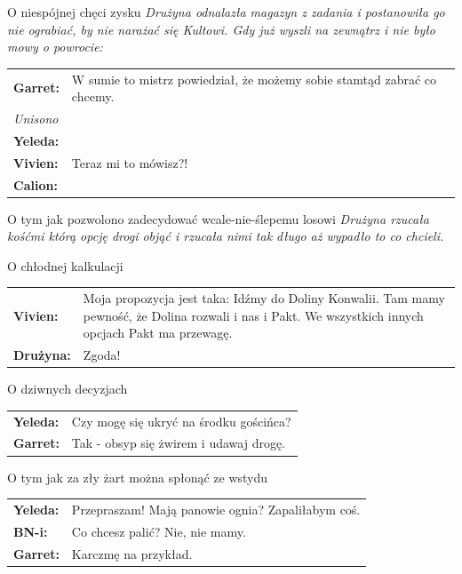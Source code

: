 \documentclass[10pt,twoside,twocolumn]{book}
\begin{document}
\begin{rpg-quotebox}{O niespójnej chęci zysku}
   \textit{Drużyna odnalazła magazyn z zadania i postanowiła go nie ograbiać, by nie narażać się Kultowi. Gdy już wyszli na zewnątrz i nie było mowy o powrocie:}\\
   
   \begin{tabularx}{\columnwidth}{lX}
      \textbf{Garret:} & W sumie to mistrz powiedział, że możemy sobie stamtąd zabrać co chcemy.\\
      \multicolumn{2}{l}{\textit{Unisono}}\\
      \textbf{Yeleda:} & \multirow{ 3}{*}{Teraz mi to mówisz?!}\\
      \textbf{Vivien:} & \\
      \textbf{Calion:} & \\
   \end{tabularx}
\end{rpg-quotebox}

\begin{rpg-quotebox}{O tym jak pozwolono zadecydować wcale-nie-ślepemu losowi}
   \textit{Drużyna rzucała kośćmi którą opcję drogi objąć i rzucała nimi tak długo aż wypadło to co chcieli.}
\end{rpg-quotebox}

\begin{rpg-quotebox}{O chłodnej kalkulacji}
   \begin{tabularx}{\columnwidth}{lX}
      \textbf{Vivien:} & Moja propozycja jest taka: Idźmy do Doliny Konwalii. Tam mamy pewność, że Dolina rozwali i nas i Pakt. We wszystkich innych opcjach Pakt ma przewagę.\\
      \textbf{Drużyna:} & Zgoda!\\
   \end{tabularx}
\end{rpg-quotebox}

\begin{rpg-quotebox}{O dziwnych decyzjach}
   \begin{tabularx}{\columnwidth}{lX}
      \textbf{Yeleda:} & Czy mogę się ukryć na środku gościńca?\\
      \textbf{Garret:} & Tak - obsyp się żwirem i udawaj drogę.\\
   \end{tabularx}
\end{rpg-quotebox}

\begin{rpg-quotebox}{O tym jak za zły żart można spłonąć ze wstydu}
   \begin{tabularx}{\columnwidth}{lX}
      \textbf{Yeleda:} & Przepraszam! Mają panowie ognia? Zapaliłabym coś.\\
      \textbf{BN-i:} & Co chcesz palić? Nie, nie mamy.\\
      \textbf{Garret:} & Karczmę na przykład.\\
   \end{tabularx}
\end{rpg-quotebox}
\end{document}
